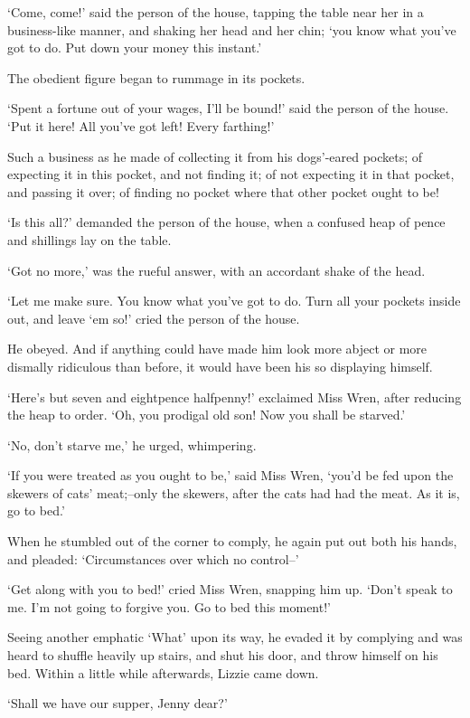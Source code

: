 ‘Come, come!’ said the person of the house, tapping the table near her
in a business-like manner, and shaking her head and her chin; ‘you know
what you’ve got to do. Put down your money this instant.’

The obedient figure began to rummage in its pockets.

‘Spent a fortune out of your wages, I’ll be bound!’ said the person of
the house. ‘Put it here! All you’ve got left! Every farthing!’

Such a business as he made of collecting it from his dogs’-eared
pockets; of expecting it in this pocket, and not finding it; of not
expecting it in that pocket, and passing it over; of finding no pocket
where that other pocket ought to be!

‘Is this all?’ demanded the person of the house, when a confused heap of
pence and shillings lay on the table.

‘Got no more,’ was the rueful answer, with an accordant shake of the
head.

‘Let me make sure. You know what you’ve got to do. Turn all your pockets
inside out, and leave ‘em so!’ cried the person of the house.

He obeyed. And if anything could have made him look more abject or more
dismally ridiculous than before, it would have been his so displaying
himself.

‘Here’s but seven and eightpence halfpenny!’ exclaimed Miss Wren, after
reducing the heap to order. ‘Oh, you prodigal old son! Now you shall be
starved.’

‘No, don’t starve me,’ he urged, whimpering.

‘If you were treated as you ought to be,’ said Miss Wren, ‘you’d be fed
upon the skewers of cats’ meat;--only the skewers, after the cats had
had the meat. As it is, go to bed.’

When he stumbled out of the corner to comply, he again put out both his
hands, and pleaded: ‘Circumstances over which no control--’

‘Get along with you to bed!’ cried Miss Wren, snapping him up. ‘Don’t
speak to me. I’m not going to forgive you. Go to bed this moment!’

Seeing another emphatic ‘What’ upon its way, he evaded it by complying
and was heard to shuffle heavily up stairs, and shut his door, and throw
himself on his bed. Within a little while afterwards, Lizzie came down.

‘Shall we have our supper, Jenny dear?’

